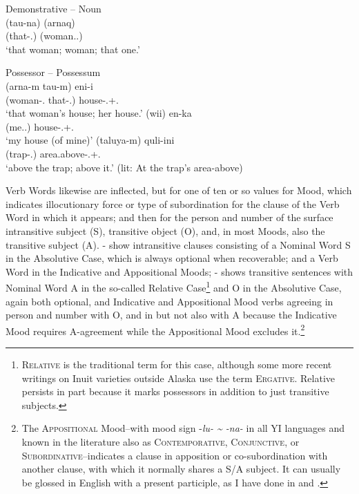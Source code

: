 \documentclass[output=paper]{langscibook}
\begin{document}
\ea\label{ex:key:2} Demonstrative -- Noun \\
\gll (tau-na) (arnaq) \\
     (that-\Abs.\Sg{}) (woman.\Abs.\Sg{}) \\
\glt `that woman; woman; that one.'
\z

\ea\label{ex:key:3}
Possessor -- Possessum \\
 \ea \gll (arna-m tau-m) eni-i\\
     (woman-\Relc.\Sg{} that-\Relc.\Sg{}) house-\Abs.\Sg+\Tsg.\Poss{}\\
 \glt `that woman's house; her house.' 
 \ex \gll (wii) en-ka\\
     (me.\Relc.\Sg{}) house-\Abs.\Sg+\Fsg.\Poss{}\\
 \glt `my house (of mine)' 
 \ex \gll (taluya-m) quli-ini\\
     (trap-\Relc.\Sg{}) area.above-\Loc.\Sg+\Tsg.\Poss{}\\
 \glt `above the trap; above it.' (lit: At the trap's area-above)
 \z
\z

Verb Words likewise are inflected, but for one of ten or so values for Mood, which indicates illocutionary force or type of subordination for the clause of the Verb Word in which it appears; and then for the person and number of the surface intransitive subject (S), transitive object (O), and, in most Moods, also the transitive subject (A). - show intransitive clauses consisting of a Nominal Word S in the Absolutive Case, which is always optional when recoverable; and a Verb Word in the Indicative and Appositional Moods; - shows transitive sentences with Nominal Word A in the so-called Relative Case\footnote{\textsc{Relative} is the traditional term for this case, although some more recent writings on Inuit varieties outside Alaska use the term \textsc{Ergative}. Relative persists in part because it marks possessors in addition to just transitive subjects.}  and O in the Absolutive Case, again both optional, and Indicative  and Appositional Mood  verbs agreeing in person and number with O, and in  but not  also with A because the Indicative Mood requires A-agreement while the Appositional Mood excludes it.\footnote{The \textsc{Appositional} Mood--with mood sign -\textit{lu- {\textasciitilde} -na-} in all YI languages and known in the literature also as \textsc{Contemporative,} \textsc{Conjunctive,} or \textsc{Subordinative}--indicates a clause in apposition or co-subordination with another clause, with which it normally shares a S/A subject. It can usually be glossed in English with a present participle, as I have done in  and .}
\end{document}
